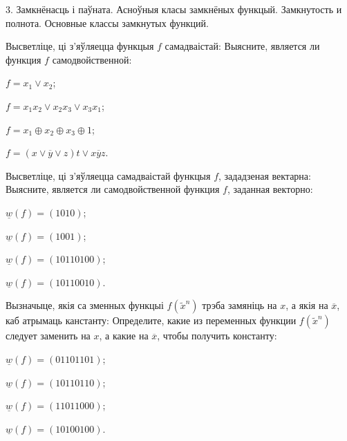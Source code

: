 \documentclass[12pt, a4paper]{article}
\begin{document}
\biLangHeader
{3. Замкнёнасць і паўната. Асноўныя класы замкнёных функцый.}
{Замкнутость и полнота. Основные классы замкнутых функций.}

\begin{problemList}

\problemItemWithCommonPart
{Высветліце, ці з'яўляецца функцыя $f$ самадваістай:}
{Выясните, является ли функция $f$ самодвойственной:}
{%
\begin{belarusianEnumerateMulticol}
    \item $f=x_1\vee x_2$;
    \item $f=x_1x_2\vee x_2x_3\vee x_3x_1$;
    \item $f=x_1\oplus x_2\oplus x_3\oplus 1$;
    \item $f=(x\vee \overline{y}\vee z)t\vee x\overline{y}z$.
\end{belarusianEnumerateMulticol} 
}

\smallskip

\problemItemWithCommonPart
{Высветліце, ці з'яўляецца самадваістай функцыя $f$, зададзеная вектарна:}
{Выясните, является ли самодвойственной функция $f$, заданная векторно:}
{%
\begin{belarusianEnumerateMulticol}
    \item $\underline{w}(f)=(1010)$;
    \item $\underline{w}(f)=(1001)$;
    \item $\underline{w}(f)=(10110100)$;
    \item $\underline{w}(f)=(10110010)$.
\end{belarusianEnumerateMulticol}
}

\smallskip

\problemItemWithCommonPart
{Вызначыце, якія са зменных функцыі $f(\tilde x^n)$ трэба замяніць на $x$,
а якія на $\overline{x}$, каб атрымаць канстанту:}
{Определите, какие из переменных функции $f(\tilde x^n)$ следует заменить на $x$,
а какие на $\overline{x}$, чтобы получить константу:}
{%
\begin{belarusianEnumerateMulticol}
    \item $\underline{w}(f)=(01101101)$;
    \item $\underline{w}(f)=(10110110)$;
    \item $\underline{w}(f)=(11011000)$;
    \item $\underline{w}(f)=(10100100)$.
\end{belarusianEnumerateMulticol}
}

\smallskip


\end{problemList}
\end{document}
